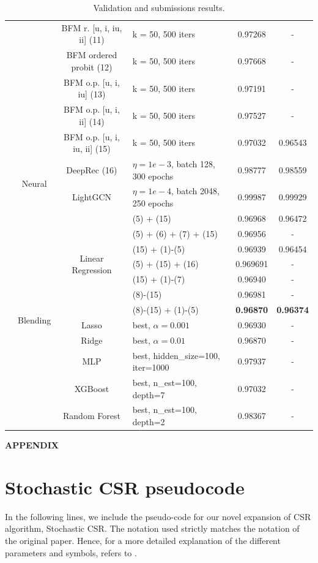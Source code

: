 \documentclass[sigconf]{acmart}
\begin{document}
\begin{table}[h]
\begin{tabular}{|c | c | c | l |  c  c|}
    && BFM r. [u, i, iu, ii] (11)& k = 50, 500 iters & 0.97268 & - \\
    && BFM ordered probit (12) & k = 50, 500 iters & 0.97668 & - \\
    && BFM o.p. [u, i, iu] (13)& k = 50, 500 iters & 0.97191 & - \\
    && BFM o.p. [u, i, ii] (14)& k = 50, 500 iters & 0.97527 & - \\
    && BFM o.p. [u, i, iu, ii] (15) & k = 50, 500 iters & 0.97032 & 0.96543 \\
    \cline{2-6}
    & \multirow{2}{*}{Neural} & DeepRec (16) & $\eta=1e-3$, batch 128, 300 epochs  &  0.98777 & 0.98559\\
    & & LightGCN & $\eta=1e-4$, batch 2048, 250 epochs &  0.99987 & 0.99929\\
    \cline{2-6}
    &\multirow{12}{*}{Blending} &  \multirow{7}{*}{Linear Regression} & (5) + (15) &  0.96968 & 0.96472\\
    &&& (5) + (6) + (7) + (15) & 0.96956 & -\\
    &&& (15) + (1)-(5) & 0.96939 & 0.96454\\
    &&& (5) + (15) + (16) & 0.969691 & -\\
    &&& (15) + (1)-(7) & 0.96940 & -\\
     &&& (8)-(15) & 0.96981 & -\\
     &&& (8)-(15) + (1)-(5) &\textbf{ 0.96870} & \textbf{0.96374}\\
    \cline{3-6}
    & &  Lasso & best, $\alpha=0.001$ &  0.96930	 & - \\
    & &  Ridge & best, $\alpha=0.01$ &  0.96870	 & - \\
    & &  MLP & best, hidden\_size=100, iter=1000 &   0.97937 & -\\
    & &  XGBoost &best,  n\_est=100, depth=7 &  0.97032 & -\\
    & &  Random Forest &best,  n\_est=100, depth=2 & 0.98367 & -\\
    \hline
  \end{tabular}
  \vspace*{0.2cm}
  \caption{Validation and submissions results.}
  \label{table:results}
\end{table}
\vspace*{\fill}
\clearpage
\twocolumn



\nocite{*}

\newpage
\appendix
\noindent
{\huge \textbf{APPENDIX}}
\section{Stochastic CSR pseudocode}
In the following lines, we include the pseudo-code for our novel expansion of CSR algorithm, Stochastic CSR. The notation used strictly matches the notation of the original paper.
Hence, for a more detailed explanation of the different parameters and symbols, refers to \cite{hu2017mitigating}.
\end{document}
